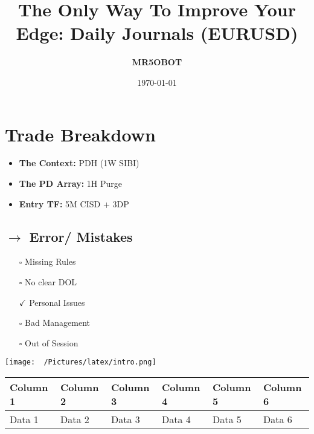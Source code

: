 \documentclass{article}
\title{The Only Way To Improve Your Edge: Daily Journals (EURUSD)}
\author{\textbf{MR5OBOT}}
\date{\today}
\begin{document}
\maketitle


\renewcommand{\arraystretch}{1.5}
\setlength{\tabcolsep}{10pt}


\begin{minipage}{0.5\textwidth}
\section*{Trade Breakdown}
  \vspace{0.1cm}
\begin{itemize}
    \item \textbf{The Context:} PDH (1W SIBI) 
    \item \textbf{The PD Array:} 1H Purge 
    \item \textbf{Entry TF:} 5M CISD + 3DP
\end{itemize}
  \vspace{0.2cm}
\subsection*{$\rightarrow$ Error/ Mistakes}
  \vspace{0.2cm}
\begin{itemize}
    \item[\(\square\)] Missing Rules
    \item[\(\square\)] No clear DOL
    \item[$\checkmark$] Personal Issues
    \item[\(\square\)] Bad Management
    \item[\(\square\)] Out of Session
\end{itemize}
\end{minipage}
\hfill
\begin{minipage}{0.25\textwidth}
  \texttt{[image: ~/Pictures/latex/intro.png]}
  \label{fig:image}
\end{minipage}
  \vspace{1.2cm}

\begin{table}[h]
    \centering
    \begin{tabularx}{\textwidth}{XXXXXX}
        \toprule
        Column 1 & Column 2 & Column 3 & Column 4 & Column 5 & Column 6 \\
        \midrule
        Data 1 & Data 2 & Data 3 & Data 4 & Data 5 & Data 6 \\
        \bottomrule
    \end{tabularx}
\end{table}
\vspace{0.8cm}
\end{document}
